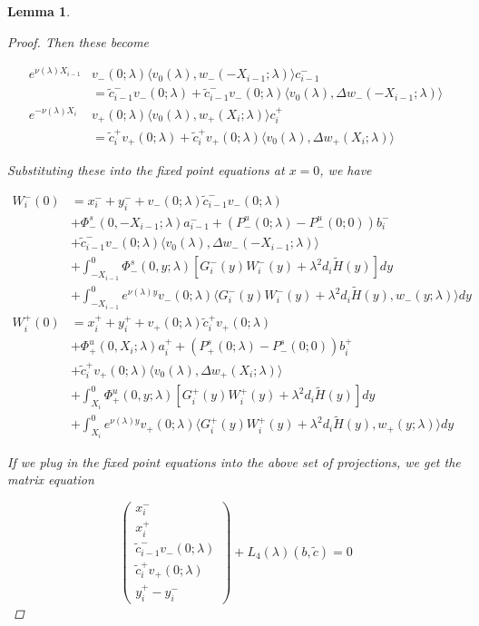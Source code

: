 \documentclass[12pt]{article}
\newtheorem{lemma}{Lemma}
\begin{document}
\begin{lemma}
\begin{proof}
Then these become

\begin{align*}
e^{\nu(\lambda)X_{i-1}} &v_-(0; \lambda) \langle v_0(\lambda), w_-(-X_{i-1}; \lambda) \rangle c_{i-1}^- \\
&= \tilde{c}_{i-1}^- v_-(0; \lambda) + \tilde{c}_{i-1}^- v_-(0; \lambda) \langle v_0(\lambda), \Delta w_-(-X_{i-1}; \lambda) \rangle \\
e^{-\nu(\lambda)X_i} &v_+(0; \lambda) \langle v_0(\lambda), w_+(X_i; \lambda) \rangle c_i^+ \\
&= \tilde{c}_i^+ v_+(0; \lambda) + \tilde{c}_i^+ v_+(0; \lambda) \langle v_0(\lambda), \Delta w_+(X_i; \lambda) \rangle 
\end{align*}

Substituting these into the fixed point equations at $x = 0$, we have

\begin{align*}
W_i^-(0) &= x_i^- + y_i^- + v_-(0; \lambda) \tilde{c}_{i-1}^- v_-(0; \lambda) \\
&+\Phi^s_-(0, -X_{i-1}; \lambda)a_{i-1}^- + (P^u_-(0; \lambda) - P^u_-(0; 0))b_i^- \\
&+ \tilde{c}_{i-1}^- v_-(0; \lambda) \langle v_0(\lambda), \Delta w_-(-X_{i-1}; \lambda) \rangle \\
&+ \int_{-X_{i-1}}^0 \Phi^s_-(0, y; \lambda) [ G_i^-(y)W_i^-(y) + \lambda^2 d_i \tilde{H}(y) ] dy \\
&+ \int_{-X_{i-1}}^0
e^{\nu(\lambda)y} v_-(0; \lambda) \langle G_i^-(y)W_i^-(y) + \lambda^2 d_i \tilde{H}(y), w_-(y; \lambda) \rangle dy \\
W_i^+(0) &= x_i^+ + y_i^+ + v_+(0; \lambda) \tilde{c}_i^+ v_+(0; \lambda) \\
&+\Phi^u_+(0, X_i; \lambda)a_i^+ + (P^s_+(0; \lambda) - P^s_-(0; 0))b_i^+ \\
&+ \tilde{c}_i^+ v_+(0; \lambda) \langle v_0(\lambda), \Delta w_+(X_i; \lambda) \rangle \\  
&+ \int_{X_i}^0 \Phi^u_+(0, y; \lambda) [ G_i^+(y)W_i^+(y) + \lambda^2 d_i \tilde{H}(y) ] dy \\
&+ \int_{X_i}^0 e^{\nu(\lambda)y} v_+(0; \lambda) \langle G_i^+(y)W_i^+(y) + \lambda^2 d_i \tilde{H}(y), w_+(y; \lambda) \rangle dy
\end{align*}

If we plug in the fixed point equations into the above set of projections, we get the matrix equation

\[
\begin{pmatrix}x_i^- \\ x_i^+ \\ 
\tilde{c}_{i-1}^- v_-(0; \lambda) \\
\tilde{c}_i^+ v_+(0; \lambda) \\
y_i^+ - y_i^- \end{pmatrix} + L_4(\lambda)(b, \tilde{c}) = 0
\]


\end{proof}
\end{lemma}
\end{document}
